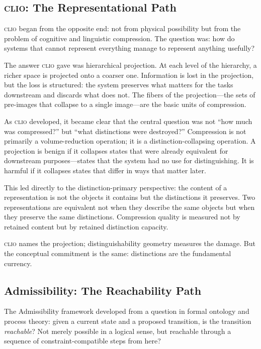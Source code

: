 \documentclass[12pt, letterpaper]{article}
\theoremstyle{remark}
\newcommand{\clio}{\textsc{clio}}
\begin{document}
\subsection{\clio{}: The Representational Path}

\clio{} began from the opposite end: not from physical possibility but from
the problem of cognitive and linguistic compression.  The question was: how
do systems that cannot represent everything manage to represent anything
usefully?

The answer \clio{} gave was hierarchical projection.  At each level of the
hierarchy, a richer space is projected onto a coarser one.  Information is
lost in the projection, but the loss is structured: the system preserves
what matters for the tasks downstream and discards what does not.  The
fibers of the projection---the sets of pre-images that collapse to a single
image---are the basic units of compression.

As \clio{} developed, it became clear that the central question was not
``how much was compressed?'' but ``what distinctions were destroyed?''
Compression is not primarily a volume-reduction operation; it is a
distinction-collapsing operation.  A projection is benign if it collapses
states that were already equivalent for downstream purposes---states that
the system had no use for distinguishing.  It is harmful if it collapses
states that differ in ways that matter later.

This led directly to the distinction-primary perspective: the content of
a representation is not the objects it contains but the distinctions it
preserves.  Two representations are equivalent not when they describe the
same objects but when they preserve the same distinctions.  Compression
quality is measured not by retained content but by retained distinction
capacity.

\clio{} names the projection; distinguishability geometry measures the
damage.  But the conceptual commitment is the same: distinctions are the
fundamental currency.

\subsection{Admissibility: The Reachability Path}

The Admissibility framework developed from a question in formal ontology and
process theory: given a current state and a proposed transition, is the
transition \emph{reachable}?  Not merely possible in a logical sense, but
reachable through a sequence of constraint-compatible steps from here?
\end{document}
